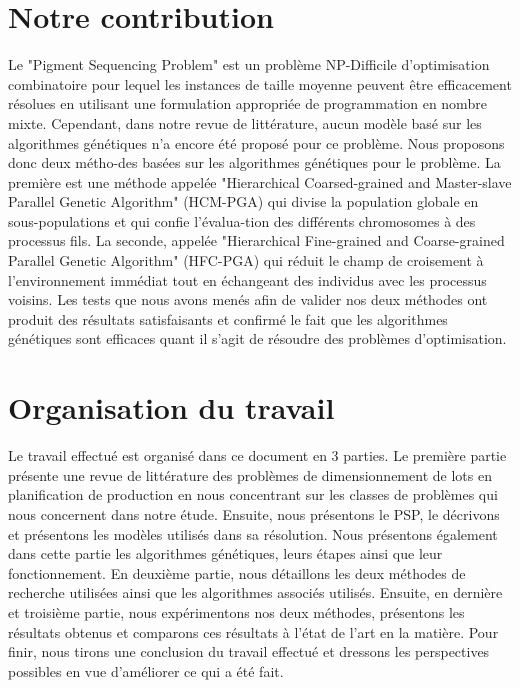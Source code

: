 \documentclass[12pt,a4paper]{article}
\begin{document}
	\section*{Notre contribution}
	Le "Pigment Sequencing Problem" est un problème NP-Difficile d'optimisation combinatoire pour lequel les instances de taille moyenne peuvent être efficacement résolues en utilisant une formulation appropriée de programmation en nombre mixte. Cependant, dans notre revue de littérature, aucun modèle basé sur les algorithmes génétiques n'a encore été proposé pour ce problème. Nous proposons donc deux métho-des basées sur les algorithmes génétiques pour le problème. La première est une méthode appelée "Hierarchical Coarsed-grained and Master-slave Parallel Genetic Algorithm" (HCM-PGA) qui divise la population globale en sous-populations et qui confie l'évalua-tion des différents chromosomes à des processus fils. La seconde, appelée "Hierarchical Fine-grained and Coarse-grained Parallel Genetic Algorithm" (HFC-PGA) qui réduit le champ de croisement à l'environnement immédiat tout en échangeant des individus avec les processus voisins. Les tests que nous avons menés afin de valider nos deux méthodes ont produit des résultats satisfaisants et confirmé le fait que les algorithmes génétiques sont efficaces quant il s'agit de résoudre des problèmes d'optimisation. 
	 
	\section*{Organisation du travail}

	Le travail effectué est organisé dans ce document en 3 parties. Le première partie présente une revue de littérature des problèmes de dimensionnement de lots en planification de production en nous concentrant sur les classes de problèmes qui nous concernent dans notre étude. Ensuite, nous présentons le PSP, le décrivons et présentons les modèles utilisés dans sa résolution. Nous présentons également dans cette partie les algorithmes génétiques, leurs étapes ainsi que leur fonctionnement. En deuxième partie, nous détaillons les deux méthodes de recherche utilisées ainsi que les algorithmes associés utilisés. Ensuite, en dernière et troisième partie, nous expérimentons  nos deux méthodes, présentons les résultats obtenus et comparons ces résultats à l'état de l'art en la matière. Pour finir, nous tirons une conclusion du travail effectué et dressons les perspectives possibles en vue d'améliorer ce qui a été fait.
	
\end{document}
